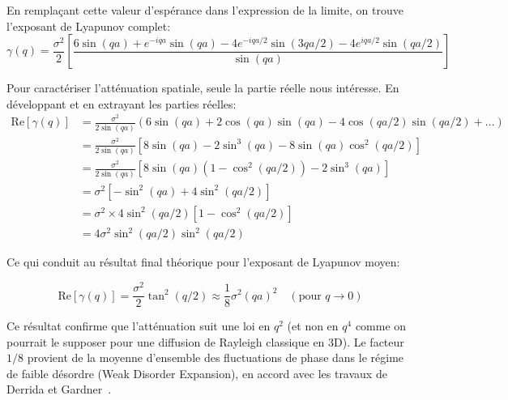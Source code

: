 En remplaçant cette valeur d'espérance dans l'expression de la limite, on trouve l'exposant de Lyapunov complet:
\begin{equation}
    \gamma(q) = \frac{\sigma^2}{2} \left[ \frac{6 \sin(qa) + e^{-iqa} \sin(qa) - 4e^{-iqa/2} \sin(3qa/2) - 4e^{iqa/2} \sin(qa/2)}{\sin(qa)} \right]
\end{equation}

Pour caractériser l'atténuation spatiale, seule la partie réelle nous intéresse. En développant et en extrayant les parties réelles:
\begin{align}
    \text{Re}[\gamma(q)] &= \frac{\sigma^2}{2 \sin(qa)} (6 \sin(qa) + 2 \cos(qa) \sin(qa) - 4 \cos(qa/2) \sin(qa/2) + \dots) \\
    &= \frac{\sigma^2}{2 \sin(qa)} [8 \sin(qa) - 2 \sin^3(qa) - 8 \sin(qa) \cos^2(qa/2)] \\
    &= \frac{\sigma^2}{2 \sin(qa)} [8 \sin(qa) (1 - \cos^2(qa/2)) - 2 \sin^3(qa)] \\
    &= \sigma^2 [-\sin^2(qa) + 4 \sin^2(qa/2)] \\
    &= \sigma^2 \times 4 \sin^2(qa/2) \left[ 1 - \cos^2(qa/2) \right] \\
    &= 4 \sigma^2 \sin^2(qa/2) \sin^2(qa/2)
\end{align}

Ce qui conduit au résultat final théorique pour l'exposant de Lyapunov moyen:

\begin{equation}
    \text{Re}[\gamma(q)] = \frac{\sigma^2}{2} \tan^2(q/2) \approx \frac{1}{8} \sigma^2 (qa)^2 \quad (\text{pour } q \to 0)
\end{equation}

Ce résultat confirme que l'atténuation suit une loi en $q^2$ (et non en $q^4$ comme on pourrait le supposer pour une diffusion de Rayleigh classique en 3D). Le facteur $1/8$ provient de la moyenne d'ensemble des fluctuations de phase dans le régime de faible désordre (Weak Disorder Expansion), en accord avec les travaux de Derrida et Gardner~\cite{Derrida1984}.

